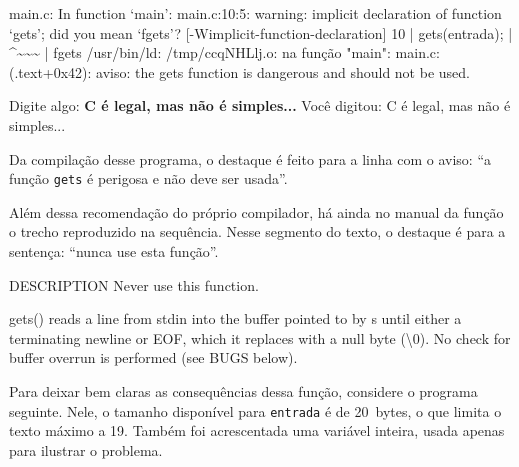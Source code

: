 \documentclass[
  11pt,
  a4paper,
]{scrbook}
\newenvironment{Shaded}{\begin{snugshade}}{\end{snugshade}}
\newcommand{\KeywordTok}[1]{\textcolor[rgb]{0.13,0.29,0.53}{\textbf{#1}}}
\newcommand{\NormalTok}[1]{#1}
\begin{document}
\begin{Shaded}
\begin{Highlighting}[]
\NormalTok{main.c: In function ‘main’:}
\NormalTok{main.c:10:5: warning: implicit declaration of function ‘gets’; did you }
\NormalTok{mean ‘fgets’? [{-}Wimplicit{-}function{-}declaration]}
\NormalTok{   10 |     gets(entrada);}
\NormalTok{      |     \^{}\textasciitilde{}\textasciitilde{}\textasciitilde{}}
\NormalTok{      |     fgets}
\NormalTok{/usr/bin/ld: /tmp/ccqNHLlj.o: na função "main":}
\NormalTok{main.c:(.text+0x42): aviso: the \textasciigrave{}gets\textquotesingle{} function is dangerous and should not }
\NormalTok{be used.}
\end{Highlighting}
\end{Shaded}

\begin{Shaded}
\begin{Highlighting}[]
\NormalTok{Digite algo: }\KeywordTok{ C é legal, mas não é simples... }
\NormalTok{Você digitou: \textquotesingle{}C é legal, mas não é simples...\textquotesingle{}}
\end{Highlighting}
\end{Shaded}

Da compilação desse programa, o destaque é feito para a linha com o
aviso: ``a função \texttt{gets} é perigosa e não deve ser usada''.

Além dessa recomendação do próprio compilador, há ainda no manual da
função o trecho reproduzido na sequência. Nesse segmento do texto, o
destaque é para a sentença: ``nunca use esta função''.

\begin{Shaded}
\begin{Highlighting}[]
\NormalTok{DESCRIPTION}
\NormalTok{       Never use this function.}

\NormalTok{       gets()  reads  a  line from stdin into the buffer pointed to by s until}
\NormalTok{       either a terminating newline or EOF, which it replaces with a null byte}
\NormalTok{       (\textquotesingle{}\textbackslash{}0\textquotesingle{}).  No check for buffer overrun is performed (see BUGS below).}
\end{Highlighting}
\end{Shaded}

Para deixar bem claras as consequências dessa função, considere o
programa seguinte. Nele, o tamanho disponível para \texttt{entrada} é de
20~bytes, o que limita o texto máximo a 19. Também foi acrescentada uma
variável inteira, usada apenas para ilustrar o problema.
\end{document}

